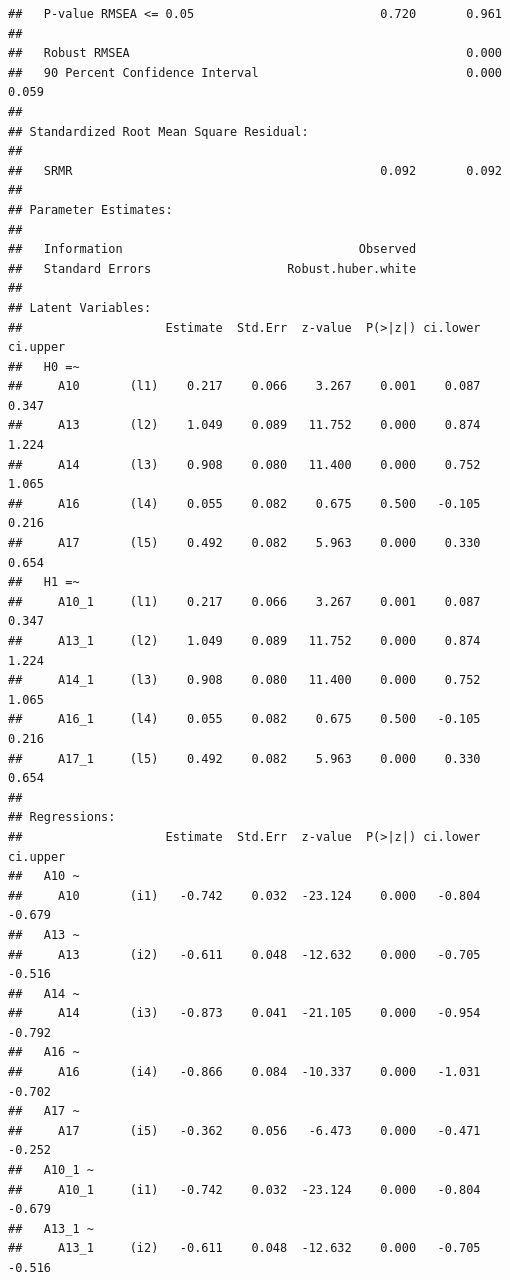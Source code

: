 \documentclass[]{article}
\begin{document}
\begin{verbatim}
##   P-value RMSEA <= 0.05                          0.720       0.961
## 
##   Robust RMSEA                                               0.000
##   90 Percent Confidence Interval                             0.000  0.059
## 
## Standardized Root Mean Square Residual:
## 
##   SRMR                                           0.092       0.092
## 
## Parameter Estimates:
## 
##   Information                                 Observed
##   Standard Errors                   Robust.huber.white
## 
## Latent Variables:
##                    Estimate  Std.Err  z-value  P(>|z|) ci.lower ci.upper
##   H0 =~                                                                 
##     A10       (l1)    0.217    0.066    3.267    0.001    0.087    0.347
##     A13       (l2)    1.049    0.089   11.752    0.000    0.874    1.224
##     A14       (l3)    0.908    0.080   11.400    0.000    0.752    1.065
##     A16       (l4)    0.055    0.082    0.675    0.500   -0.105    0.216
##     A17       (l5)    0.492    0.082    5.963    0.000    0.330    0.654
##   H1 =~                                                                 
##     A10_1     (l1)    0.217    0.066    3.267    0.001    0.087    0.347
##     A13_1     (l2)    1.049    0.089   11.752    0.000    0.874    1.224
##     A14_1     (l3)    0.908    0.080   11.400    0.000    0.752    1.065
##     A16_1     (l4)    0.055    0.082    0.675    0.500   -0.105    0.216
##     A17_1     (l5)    0.492    0.082    5.963    0.000    0.330    0.654
## 
## Regressions:
##                    Estimate  Std.Err  z-value  P(>|z|) ci.lower ci.upper
##   A10 ~                                                                 
##     A10       (i1)   -0.742    0.032  -23.124    0.000   -0.804   -0.679
##   A13 ~                                                                 
##     A13       (i2)   -0.611    0.048  -12.632    0.000   -0.705   -0.516
##   A14 ~                                                                 
##     A14       (i3)   -0.873    0.041  -21.105    0.000   -0.954   -0.792
##   A16 ~                                                                 
##     A16       (i4)   -0.866    0.084  -10.337    0.000   -1.031   -0.702
##   A17 ~                                                                 
##     A17       (i5)   -0.362    0.056   -6.473    0.000   -0.471   -0.252
##   A10_1 ~                                                               
##     A10_1     (i1)   -0.742    0.032  -23.124    0.000   -0.804   -0.679
##   A13_1 ~                                                               
##     A13_1     (i2)   -0.611    0.048  -12.632    0.000   -0.705   -0.516

\end{verbatim}
\end{document}
